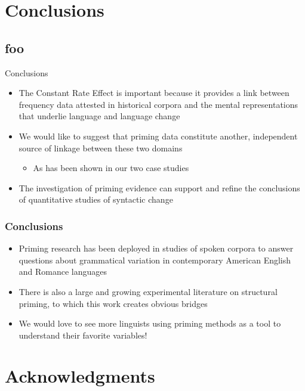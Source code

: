 \documentclass{digs-slides}
\begin{document}
\section{Conclusions}
\label{sec:conclusion}

\subsection*{foo}

\begin{frame}{Conclusions}
    \begin{itemize}
      \item The Constant Rate Effect is important because it
        provides a link between frequency data attested in historical
        corpora and the mental representations that underlie language
        and language change
      \item We would like to suggest that priming data constitute
        another, independent source of linkage between these two domains
        \begin{itemize}
          \item As has been shown in our two case studies
        \end{itemize}
      \item The investigation of priming evidence can support and refine
        the conclusions of quantitative studies of syntactic change
    \end{itemize}
\end{frame}

\begin{frame}
    \frametitle{Conclusions}
    \begin{itemize}
      \item Priming research has been deployed in studies of spoken
        corpora to answer questions about grammatical variation in
        contemporary American English and Romance languages
      \item There is also a large and growing experimental literature on
        structural priming, to which this work creates obvious bridges
      \item We would love to see more linguists using priming methods as
        a tool to understand their favorite variables!
    \end{itemize}
\end{frame}

\appendix{}

\section{Acknowledgments}
\end{document}
